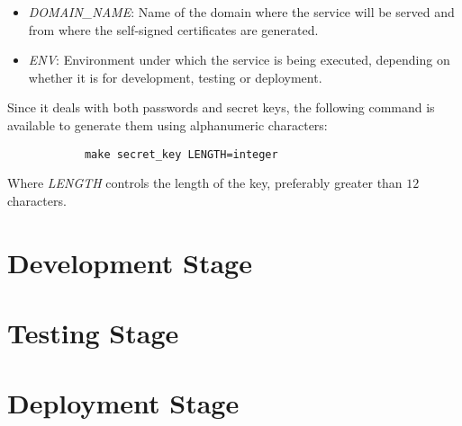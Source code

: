 \documentclass[12pt,a4paper]{article}
\begin{document}
{{            \begin{itemize}[label=$\bullet$]
                \item \emph{DOMAIN\_NAME}: Name of the domain where the service will be served and from where the self-signed certificates are generated.
                \item \emph{ENV}: Environment under which the service is being executed, depending on whether it is for development, testing or deployment.
            \end{itemize}

            Since it deals with both passwords and secret keys, the following command 
            is available to generate them using alphanumeric characters:

            \begin{verbatim}
            make secret_key LENGTH=integer
            \end{verbatim}

            Where \emph{LENGTH} controls the length of the key, preferably greater 
            than $12$ characters.
        }

    }

    \newpage

    \section{Development Stage}

    \newpage

    \section{Testing Stage}

    \newpage

    \section{Deployment Stage}
\end{document}
